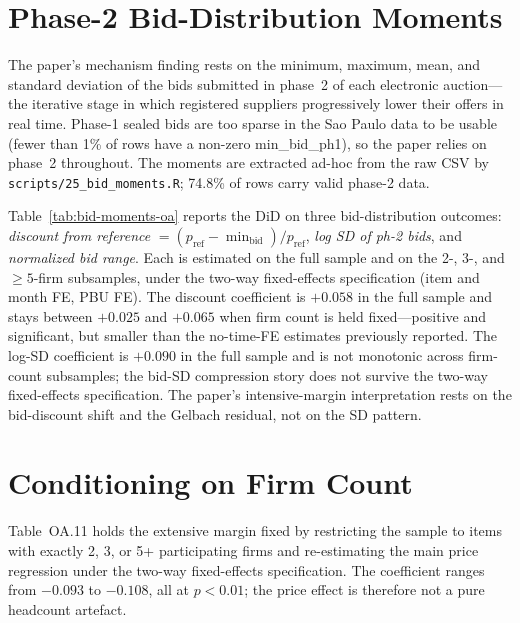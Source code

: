 \documentclass[12pt]{article}
\begin{document}

\section{Phase-2 Bid-Distribution Moments}

The paper's mechanism finding rests on the minimum, maximum, mean, and standard deviation of the bids submitted in phase~2 of each electronic auction---the iterative stage in which registered suppliers progressively lower their offers in real time. Phase-1 sealed bids are too sparse in the Sao Paulo data to be usable (fewer than 1\% of rows have a non-zero min\_bid\_ph1), so the paper relies on phase~2 throughout. The moments are extracted ad-hoc from the raw CSV by \texttt{scripts/25\_bid\_moments.R}; 74.8\% of rows carry valid phase-2 data.

Table~\ref{tab:bid-moments-oa} reports the DiD on three bid-distribution outcomes: \textit{discount from reference} $=(p_\text{ref}-\min_\text{bid})/p_\text{ref}$, \textit{log SD of ph-2 bids}, and \textit{normalized bid range}. Each is estimated on the full sample and on the 2-, 3-, and $\geq\!5$-firm subsamples, under the two-way fixed-effects specification (item and month FE, PBU FE). The discount coefficient is $+0.058$ in the full sample and stays between $+0.025$ and $+0.065$ when firm count is held fixed---positive and significant, but smaller than the no-time-FE estimates previously reported. The log-SD coefficient is $+0.090$ in the full sample and is not monotonic across firm-count subsamples; the bid-SD compression story does not survive the two-way fixed-effects specification. The paper's intensive-margin interpretation rests on the bid-discount shift and the Gelbach residual, not on the SD pattern.


\section{Conditioning on Firm Count}

Table~OA.11 holds the extensive margin fixed by restricting the sample to items with exactly 2, 3, or 5+ participating firms and re-estimating the main price regression under the two-way fixed-effects specification. The coefficient ranges from $-0.093$ to $-0.108$, all at $p<0.01$; the price effect is therefore not a pure headcount artefact.
\end{document}
